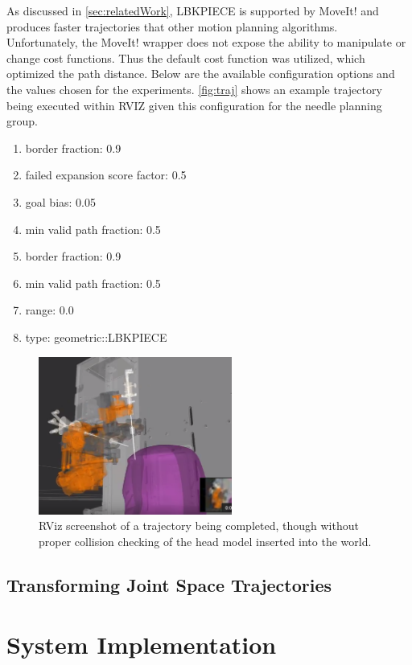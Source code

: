 \documentclass[12pt]{report}
\begin{document}
As discussed in \autoref{sec:relatedWork}, LBKPIECE is supported by MoveIt! and produces faster trajectories that other motion planning algorithms. Unfortunately, the MoveIt! wrapper does not expose the ability to manipulate or change cost functions. Thus the default cost function was utilized, which optimized the path distance. Below are the available configuration options and the values chosen for the experiments. \autoref{fig:traj} shows an example trajectory being executed within RVIZ given this configuration for the needle planning group.

\begin{enumerate}
\item border fraction: 0.9
\item failed expansion score factor: 0.5
\item goal bias: 0.05
\item min valid path fraction: 0.5
\item border fraction: 0.9
\item min valid path fraction: 0.5
\item range: 0.0
\item type: geometric::LBKPIECE
\end{enumerate}

\begin{figure}[thpb]
	\centering
	\includegraphics[width = 2.5in]{images/traj.png}
    \caption{RViz screenshot of a trajectory being completed, though without proper collision checking of the head model inserted into the world.}
    \label{fig:traj}
\end{figure}
\section{Transforming Joint Space Trajectories}

\chapter{System Implementation}
\end{document}

